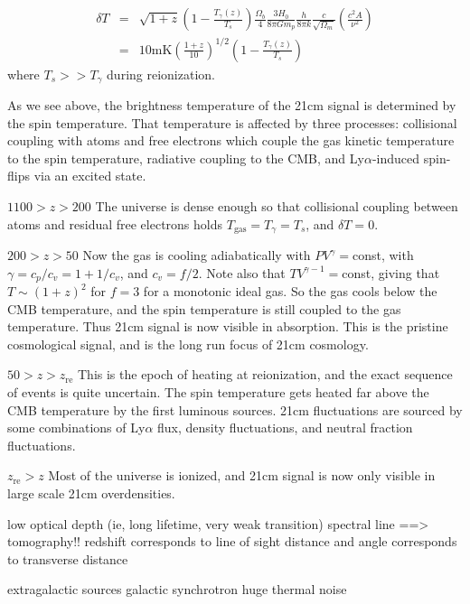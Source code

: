 \begin{eqnarray}
\delta T&=&\sqrt{1+z}\left(1-\frac{T_\gamma(z)}{T_s}\right)\frac{\Omega_b}{4}\frac{3H_0}{8\pi Gm_p}\frac{h}{8\pi k}\frac{c}{\sqrt{\Omega_m}}\left(\frac{c^2A}{\nu^2}\right)\\
&=&10\text{mK}\left(\frac{1+z}{10}\right)^{1/2}\left(1-\frac{T_\gamma(z)}{T_s}\right)
\end{eqnarray}
where $T_s>>T_\gamma$ during reionization. 

As we see above, the brightness temperature of the 21cm signal is determined by the spin temperature. That temperature is affected by three processes: collisional coupling with atoms and free electrons which couple the gas kinetic temperature to the spin temperature, radiative coupling to the CMB, and Ly$\alpha$-induced spin-flips via an excited state. 

\textbf{$1100>z>200$} The universe is dense enough so that collisional coupling between atoms and residual free electrons holds $T_\text{gas}=T_\gamma=T_s$, and $\delta T=0$.

\textbf{$200>z>50$} Now the gas is cooling adiabatically with $PV^\gamma=$const, with $\gamma=c_p/c_v=1+1/c_v$, and $c_v=f/2$. Note also that $TV^{\gamma-1}=$const, giving that $T\sim (1+z)^2$ for $f=3$ for a monotonic ideal gas. So the gas cools below the CMB temperature, and the spin temperature is still coupled to the gas temperature. Thus 21cm signal is now visible in absorption. This is the pristine cosmological signal, and is the long run focus of 21cm cosmology.

\textbf{$50>z>z_\text{re}$} This is the epoch of heating at reionization, and the exact sequence of events is quite uncertain. The spin temperature gets heated far above the CMB temperature by the first luminous sources. 21cm fluctuations are sourced by some combinations of Ly$\alpha$ flux, density fluctuations, and neutral fraction fluctuations.  

\textbf{$z_\text{re}>z$} Most of the universe is ionized, and 21cm signal is now only visible in large scale 21cm overdensities. 


low optical depth (ie, long lifetime, very weak transition) spectral line ==> tomography!!
redshift corresponds to line of sight distance
and angle corresponds to transverse distance

extragalactic sources
galactic synchrotron
huge thermal noise 



